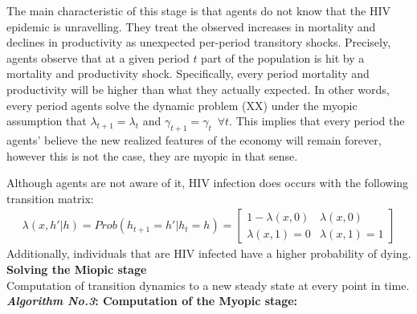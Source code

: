 The main characteristic of this stage is that agents do not know that the HIV epidemic is unravelling. They treat the observed increases in mortality and declines in productivity as unexpected per-period transitory shocks. Precisely, agents  observe that at a given period $t$ part of the population is hit by a mortality and productivity shock. Specifically, every period mortality and productivity will be higher than what they actually expected. In other words, every period agents solve the dynamic problem (XX) under the myopic assumption that $\lambda_{t+1}=\lambda_{t}$ and $\gamma_{t+1}=\gamma_{t}\,\,\, \forall t$. This implies that every period the agents' believe the new realized features of the economy will remain forever, however this is not the case, they are myopic in that sense.

Although agents are not aware of it, HIV infection does occurs with the following transition matrix:
\begin{align}
     \lambda(x,h'|h) = Prob(h_{t+1}=h'|h_{t}=h)=    \begin{bmatrix}%
    1-\lambda(x,0) & \lambda(x,0)\\
    \lambda(x,1)=0 & \lambda(x,1)=1
    \end{bmatrix}
\end{align}
Additionally, individuals that are HIV infected have a higher probability of dying.\\
\textbf{Solving the Miopic stage}\\
Computation of transition dynamics to a new steady state at every point in time.\\
\noindent \textbf{\textit{Algorithm No.3}: Computation of the Myopic stage:}\\

